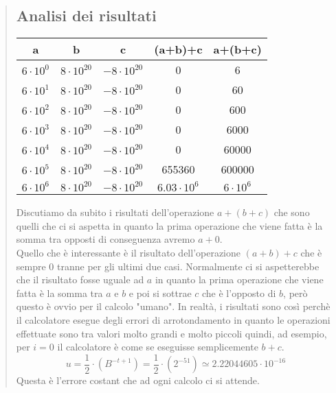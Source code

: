 \documentclass[10pt]{article}
\begin{document}
\begin{quote}
    \subsection{Analisi dei risultati}
    \begin{center}
        \begin{tabular}{| c | c | c | c | c |}
            \hline
            \textbf{a} & \textbf{b} & \textbf{c} & \textbf{(a+b)+c} & \textbf{a+(b+c)} \\
            \hline
            $6\cdot 10^{0}$  & $8 \cdot 10^{20}$ & $-8 \cdot 10^{20}$ & 0 & 6\\
            \hline
            $6\cdot 10^{1}$ & $8 \cdot 10^{20}$ & $-8 \cdot 10^{20}$ & 0 & 60\\
            \hline
            $6\cdot 10^{2}$ & $8 \cdot 10^{20}$ & $-8 \cdot 10^{20}$ & 0 & 600\\
            \hline
            $6\cdot 10^{3}$ & $8 \cdot 10^{20}$ & $-8 \cdot 10^{20}$ & 0 & 6000\\
            \hline
            $6\cdot 10^{4}$ & $8 \cdot 10^{20}$ & $-8 \cdot 10^{20}$ & 0 & 60000\\
            \hline
            $6\cdot 10^{5}$ & $8 \cdot 10^{20}$ & $-8 \cdot 10^{20}$ & 655360 & 600000\\
            \hline
            $6\cdot 10^{6}$ & $8 \cdot 10^{20}$ & $-8 \cdot 10^{20}$ & $6.03\cdot 10^{6}$ & $6\cdot 10^{6}$ \\
            \hline
        \end{tabular}
    \end{center}
    Discutiamo da subito i risultati dell'operazione $a+(b+c)$ che sono quelli che ci si aspetta in quanto la prima operazione che viene fatta è la somma tra opposti di conseguenza avremo $a+0$.\\
    Quello che è interessante è il risultato dell'operazione $(a+b)+c$ che è sempre 0 tranne per gli ultimi due casi. Normalmente ci si aspetterebbe che il risultato fosse uguale ad $a$ in quanto la prima operazione che viene fatta è la somma tra $a$ e $b$ e poi si sottrae $c$ che è l'opposto di $b$, però questo è ovvio per il calcolo "umano". In realtà, i risultati sono così  perchè il calcolatore esegue degli errori di arrotondamento in quanto le operazioni effettuate sono tra valori molto grandi e molto piccoli quindi, ad esempio, per $i=0$ il calcolatore è come se eseguisse semplicemente $b+c$.
    \begin{equation*}
        u=\frac{1}{2}\cdot\left(B^{-t+1}\right) = \frac{1}{2}\cdot\left(2^{-51}\right) \simeq 2.22044605\cdot 10^{-16}  
    \end{equation*}
    Questa è l'errore costant che ad ogni calcolo ci si attende.
    

\end{quote}
\end{document}
